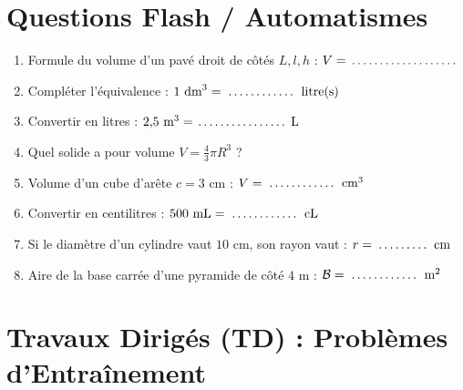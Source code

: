 \newpage

\section{Questions Flash / Automatismes}

\begin{automatisme}
\begin{enumerate}[label=\textbf{Q\arabic*.}, itemsep=1pt]
    \item Formule du volume d'un pavé droit de côtés $L, l, h$ : $V = \pointille[3cm]$
    \item Compléter l'équivalence : $1\text{ dm}^3 = \pointille[2cm]\text{ litre(s)}$
    \item Convertir en litres : $2{,}5\text{ m}^3 = \pointille[2.5cm]\text{ L}$
    \item Quel solide a pour volume $V = \frac{4}{3}\pi R^3$ ? \pointille[3cm]
    \item Volume d'un cube d'arête $c = 3\text{ cm}$ : $V = \pointille[2cm]\text{ cm}^3$
    \item Convertir en centilitres : $500\text{ mL} = \pointille[2cm]\text{ cL}$
    \item Si le diamètre d'un cylindre vaut $10\text{ cm}$, son rayon vaut : $r = \pointille[1.5cm]\text{ cm}$
    \item Aire de la base carrée d'une pyramide de côté $4\text{ m}$ : $\mathcal{B} = \pointille[2cm]\text{ m}^2$
\end{enumerate}
\end{automatisme}

\section{Travaux Dirigés (TD) : Problèmes d'Entraînement}

